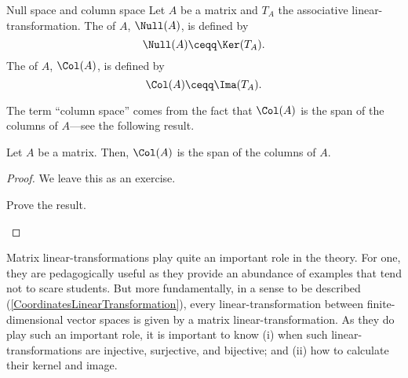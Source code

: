 \begin{dfn}{Null space and column space}{}
	Let $A$ be a matrix and $T_A$ the associative linear-transformation.  The  of $A$, $\Null (A)$, is defined by
	\begin{equation}
		\Null (A)\ceqq \Ker (T_A).
	\end{equation}
	The  of $A$, $\Col (A)$, is defined by
	\begin{equation}
		\Col (A)\ceqq \Ima (T_A).
	\end{equation}
	\begin{rmk}
		The term ``column space'' comes from the fact that $\Col (A)$ is the span of the columns of $A$---see the following result.
	\end{rmk}
\end{dfn}
\begin{prp}{}{}
	Let $A$ be a matrix.  Then, $\Col (A)$ is the span of the columns of $A$.
	\begin{proof}
		We leave this as an exercise.
		\begin{exr}[breakable=false]{}{}
			Prove the result.
		\end{exr}
	\end{proof}
\end{prp}
Matrix linear-transformations play quite an important role in the theory.  For one, they are pedagogically useful as they provide an abundance of examples that tend not to scare students.  But more fundamentally, in a sense to be described (\cref{CoordinatesLinearTransformation}), every linear-transformation between finite-dimensional vector spaces is given by a matrix linear-transformation.  As they do play such an important role, it is important to know (i) when such linear-transformations are injective, surjective, and bijective; and (ii) how to calculate their kernel and image.

